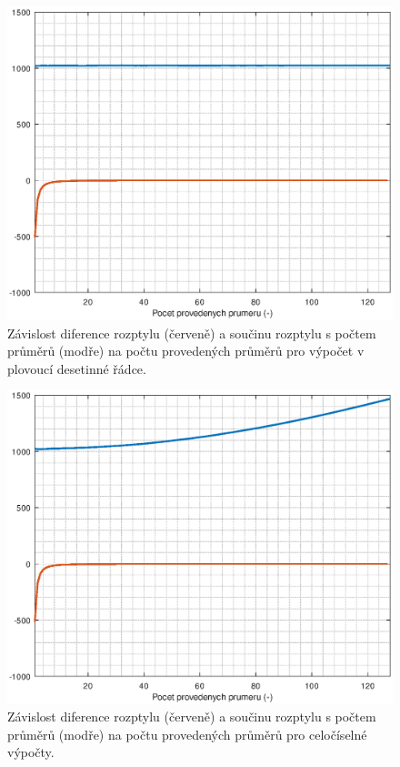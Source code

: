 \begin{figure}[htbp]
\includegraphics[width=\textwidth,keepaspectratio]{images/averaging_float_difference_error.eps}\caption{Závislost diference rozptylu (červeně) a součinu rozptylu s počtem průměrů (modře) na počtu provedených průměrů pro výpočet v plovoucí desetinné řádce.}\label{averaging_float_difference_error}
\end{figure}

\begin{figure}[htbp]
\includegraphics[width=\textwidth,keepaspectratio]{images/averaging_integer_difference_error.eps}\caption{Závislost diference rozptylu (červeně) a součinu rozptylu s počtem průměrů (modře) na počtu provedených průměrů pro celočíselné výpočty.}\label{averaging_integer_difference_error}
\end{figure}

